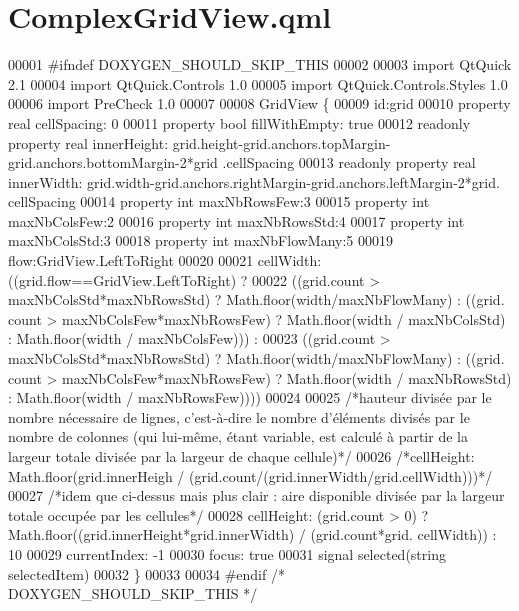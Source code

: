 \hypertarget{ComplexGridView_8qml}{\section{Complex\-Grid\-View.\-qml}
\label{ComplexGridView_8qml}
}

\begin{DoxyCode}
00001 \textcolor{preprocessor}{#ifndef DOXYGEN\_SHOULD\_SKIP\_THIS}
00002 \textcolor{preprocessor}{}
00003 \textcolor{keyword}{import} QtQuick 2.1
00004 import QtQuick.Controls 1.0
00005 import QtQuick.Controls.Styles 1.0
00006 import PreCheck 1.0
00007 
00008 GridView \{
00009     \textcolor{keywordtype}{id}:grid
00010     \textcolor{keyword}{property} real cellSpacing: 0
00011     \textcolor{keyword}{property} \textcolor{keywordtype}{bool} fillWithEmpty: \textcolor{keyword}{true}
00012     readonly \textcolor{keyword}{property} real innerHeight: grid.height-grid.anchors.topMargin-grid.anchors.bottomMargin-2*grid
      .cellSpacing
00013     readonly \textcolor{keyword}{property} real innerWidth: grid.width-grid.anchors.rightMargin-grid.anchors.leftMargin-2*grid.
      cellSpacing
00014     \textcolor{keyword}{property} \textcolor{keywordtype}{int} maxNbRowsFew:3
00015     \textcolor{keyword}{property} \textcolor{keywordtype}{int} maxNbColsFew:2
00016     \textcolor{keyword}{property} \textcolor{keywordtype}{int} maxNbRowsStd:4
00017     \textcolor{keyword}{property} \textcolor{keywordtype}{int} maxNbColsStd:3
00018     \textcolor{keyword}{property} \textcolor{keywordtype}{int} maxNbFlowMany:5
00019     flow:GridView.LeftToRight
00020     
00021     cellWidth: ((grid.flow==GridView.LeftToRight) ?
00022                    ((grid.count > maxNbColsStd*maxNbRowsStd) ? Math.floor(width/maxNbFlowMany) : ((grid.
      count > maxNbColsFew*maxNbRowsFew) ? Math.floor(width / maxNbColsStd) : Math.floor(width / maxNbColsFew))) :
00023                    ((grid.count > maxNbColsStd*maxNbRowsStd) ? Math.floor(width/maxNbFlowMany) : ((grid.
      count > maxNbColsFew*maxNbRowsFew) ? Math.floor(width / maxNbRowsStd) : Math.floor(width / maxNbRowsFew))))
00024                    
00025     \textcolor{comment}{/*hauteur divisée par le nombre nécessaire de lignes, c'est-à-dire le nombre d'éléments divisés par le
       nombre de colonnes (qui lui-même, étant variable, est calculé à partir de la largeur totale divisée par la
       largeur de chaque cellule)*/}
00026     \textcolor{comment}{/*cellHeight: Math.floor(grid.innerHeigh / (grid.count/(grid.innerWidth/grid.cellWidth)))*/}
00027     \textcolor{comment}{/*idem que ci-dessus mais plus clair : aire disponible divisée par la largeur totale occupée par les
       cellules*/}
00028     cellHeight: (grid.count > 0) ? Math.floor((grid.innerHeight*grid.innerWidth) / (grid.count*grid.
      cellWidth)) : 10 
00029     currentIndex: -1
00030     focus: \textcolor{keyword}{true}
00031     signal selected(\textcolor{keywordtype}{string} selectedItem)
00032 \}
00033 
00034 \textcolor{preprocessor}{#endif }\textcolor{comment}{/* DOXYGEN\_SHOULD\_SKIP\_THIS */}\textcolor{preprocessor}{}
\end{DoxyCode}
